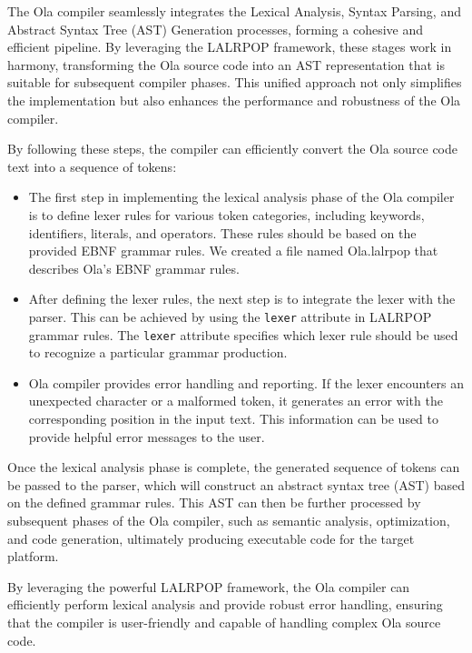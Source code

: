 The Ola compiler seamlessly integrates the Lexical Analysis, Syntax Parsing, and Abstract Syntax Tree (AST) Generation processes, forming a cohesive and efficient pipeline. By leveraging the LALRPOP framework, these stages work in harmony, transforming the Ola source code into an AST representation that is suitable for subsequent compiler phases. This unified approach not only simplifies the implementation but also enhances the performance and robustness of the Ola compiler.

By following these steps, the compiler can efficiently convert the Ola source code text into a sequence of tokens:

\begin{itemize}

  \item The first step in implementing the lexical analysis phase of the Ola compiler is to define lexer rules for various token categories, including keywords, identifiers, literals, and operators. These rules should be based on the provided EBNF grammar rules. We created a file named Ola.lalrpop that describes Ola's EBNF grammar rules.

  \item After defining the lexer rules, the next step is to integrate the lexer with the parser. This can be achieved by using the \texttt{lexer} attribute in LALRPOP grammar rules. The \texttt{lexer} attribute specifies which lexer rule should be used to recognize a particular grammar production.

  \item Ola compiler provides error handling and reporting. If the lexer encounters an unexpected character or a malformed token, it generates an error with the corresponding position in the input text. This information can be used to provide helpful error messages to the user.

\end{itemize}

Once the lexical analysis phase is complete, the generated sequence of tokens can be passed to the parser, which will construct an abstract syntax tree (AST) based on the defined grammar rules. This AST can then be further processed by subsequent phases of the Ola compiler, such as semantic analysis, optimization, and code generation, ultimately producing executable code for the target platform.

By leveraging the powerful LALRPOP framework, the Ola compiler can efficiently perform lexical analysis and provide robust error handling, ensuring that the compiler is user-friendly and capable of handling complex Ola source code.